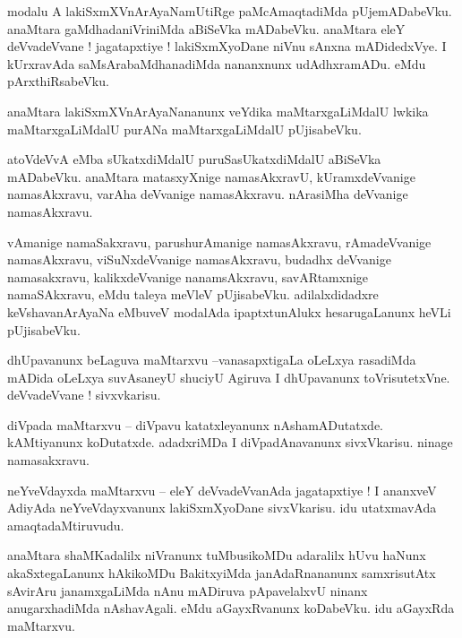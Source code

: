 \documentclass{article}
\begin{document}
\begin{mn}%
modalu A lakiSxmXVnArAyaNamUtiRge paMcAmaqtadiMda pUjemADabeVku. anaMtara gaMdhadaniVriniMda 
aBiSeVka mADabeVku. anaMtara eleY deVvadeVvane ! jagatapxtiye ! lakiSxmXyoDane niVnu sAnxna 
mADidedxVye. I kUrxravAda saMsArabaMdhanadiMda nananxnunx udAdhxramADu. eMdu pArxthiRsabeVku.
\end{mn}

\begin{mn}%
anaMtara lakiSxmXVnArAyaNananunx veYdika maMtarxgaLiMdalU lwkika maMtarxgaLiMdalU purANa 
maMtarxgaLiMdalU pUjisabeVku.
\end{mn}

\begin{mn}%
atoVdeVvA eMba sUkatxdiMdalU puruSasUkatxdiMdalU aBiSeVka mADabeVku. anaMtara matasxyXnige 
namasAkxravU, kUramxdeVvanige namasAkxravu, varAha deVvanige namasAkxravu. nArasiMha deVvanige 
namasAkxravu.
\end{mn}

\begin{mn}%
vAmanige namaSakxravu, parushurAmanige namasAkxravu, rAmadeVvanige namasAkxravu, viSuNxdeVvanige 
namasAkxravu, budadhx deVvanige namasakxravu, kalikxdeVvanige nanamsAkxravu, savARtamxnige 
namaSAkxravu, eMdu taleya meVleV pUjisabeVku. adilalxdidadxre keVshavanArAyaNa eMbuveV modalAda 
ipaptxtunAlukx hesarugaLanunx heVLi pUjisabeVku.
\end{mn}

\begin{mn}%
dhUpavanunx beLaguva maMtarxvu --vanasapxtigaLa oLeLxya rasadiMda mADida oLeLxya suvAsaneyU shuciyU 
Agiruva I dhUpavanunx toVrisutetxVne. deVvadeVvane ! sivxvkarisu.
\end{mn}

\begin{mn}%
diVpada maMtarxvu -- diVpavu katatxleyanunx nAshamADutatxde. kAMtiyanunx koDutatxde. adadxriMDa I 
diVpadAnavanunx sivxVkarisu. ninage namasakxravu.
\end{mn}

\begin{mn}%
neYveVdayxda maMtarxvu -- eleY deVvadeVvanAda jagatapxtiye ! I ananxveV AdiyAda neYveVdayxvanunx 
lakiSxmXyoDane sivxVkarisu. idu utatxmavAda amaqtadaMtiruvudu.
\end{mn}

\begin{mn}%
anaMtara shaMKadalilx niVranunx tuMbusikoMDu adaralilx hUvu haNunx akaSxtegaLanunx hAkikoMDu 
BakitxyiMda janAdaRnananunx samxrisutAtx sAvirAru janamxgaLiMda nAnu mADiruva pApavelalxvU ninanx 
anugarxhadiMda nAshavAgali. eMdu aGayxRvanunx koDabeVku. idu aGayxRda maMtarxvu.
\end{mn}
\end{document}
